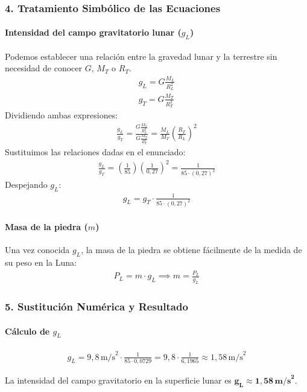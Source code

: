 \subsubsection*{4. Tratamiento Simbólico de las Ecuaciones}
\paragraph{Intensidad del campo gravitatorio lunar ($g_L$)}
Podemos establecer una relación entre la gravedad lunar y la terrestre sin necesidad de conocer $G$, $M_T$ o $R_T$.
\begin{gather}
    g_L = G \frac{M_L}{R_L^2} \\
    g_T = G \frac{M_T}{R_T^2}
\end{gather}
Dividiendo ambas expresiones:
\begin{gather}
    \frac{g_L}{g_T} = \frac{G \frac{M_L}{R_L^2}}{G \frac{M_T}{R_T^2}} = \frac{M_L}{M_T} \left( \frac{R_T}{R_L} \right)^2
\end{gather}
Sustituimos las relaciones dadas en el enunciado:
\begin{gather}
    \frac{g_L}{g_T} = \left(\frac{1}{85}\right) \left( \frac{1}{0,27} \right)^2 = \frac{1}{85 \cdot (0,27)^2}
\end{gather}
Despejando $g_L$:
\begin{gather}
    g_L = g_T \cdot \frac{1}{85 \cdot (0,27)^2}
\end{gather}
\paragraph{Masa de la piedra ($m$)}
Una vez conocida $g_L$, la masa de la piedra se obtiene fácilmente de la medida de su peso en la Luna:
\begin{gather}
    P_L = m \cdot g_L \implies m = \frac{P_L}{g_L}
\end{gather}

\subsubsection*{5. Sustitución Numérica y Resultado}
\paragraph{Cálculo de $g_L$}
\begin{gather}
    g_L = 9,8 \, \text{m/s}^2 \cdot \frac{1}{85 \cdot 0,0729} = 9,8 \cdot \frac{1}{6,1965} \approx 1,58 \, \text{m/s}^2
\end{gather}
\begin{cajaresultado}
    La intensidad del campo gravitatorio en la superficie lunar es $\boldsymbol{g_L \approx 1,58 \, \textbf{m/s}^2}$.
\end{cajaresultado}
